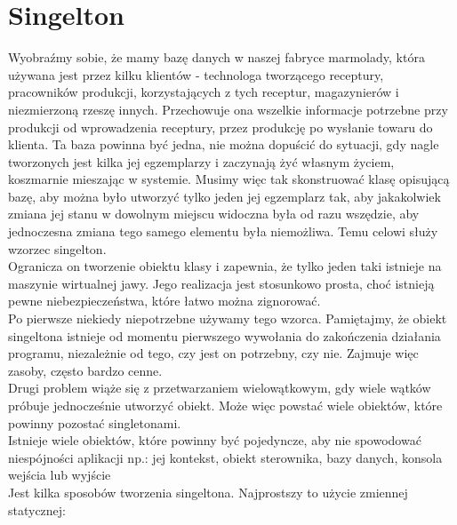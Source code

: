 \documentclass[12pt,a4paper]{article}
\begin{document}
	\section{Singelton}
	Wyobraźmy sobie, że mamy bazę danych w naszej fabryce marmolady, która używana jest przez kilku klientów - technologa tworzącego receptury, pracowników produkcji, korzystających z tych receptur, magazynierów i niezmierzoną rzeszę innych. Przechowuje ona wszelkie informacje potrzebne przy produkcji od wprowadzenia receptury, przez produkcję po wysłanie towaru do klienta. Ta baza powinna być jedna, nie można dopuścić do sytuacji, gdy nagle tworzonych jest kilka jej egzemplarzy i zaczynają żyć własnym życiem,  koszmarnie mieszając w systemie. Musimy więc tak skonstruować klasę opisującą bazę, aby można było utworzyć tylko jeden jej egzemplarz tak, aby jakakolwiek zmiana jej stanu w dowolnym miejscu widoczna była od razu wszędzie, aby jednoczesna zmiana tego samego elementu była niemożliwa. Temu celowi służy wzorzec singelton. \\
	Ogranicza on tworzenie obiektu klasy i zapewnia, że tylko jeden taki istnieje na maszynie wirtualnej jawy. Jego realizacja jest stosunkowo prosta, choć istnieją pewne niebezpieczeństwa, które łatwo można zignorować. \\
	Po pierwsze niekiedy niepotrzebne używamy tego wzorca. Pamiętajmy, że obiekt singeltona istnieje od momentu pierwszego wywołania do zakończenia działania programu, niezależnie od tego, czy jest on potrzebny, czy nie. Zajmuje więc zasoby, często bardzo cenne.\\
	Drugi problem wiąże się z przetwarzaniem wielowątkowym, gdy wiele wątków próbuje jednocześnie utworzyć obiekt. Może więc powstać wiele obiektów, które powinny pozostać singletonami\cite{PankajKumar}. \\
	Istnieje wiele obiektów, które powinny być pojedyncze, aby nie spowodować niespójności aplikacji np.: jej kontekst, obiekt sterownika, bazy danych, konsola wejścia lub wyjście\cite{RohitJosh}\\
	Jest kilka sposobów tworzenia singeltona. Najprostszy to użycie zmiennej statycznej:
	
	
	
\end{document}
